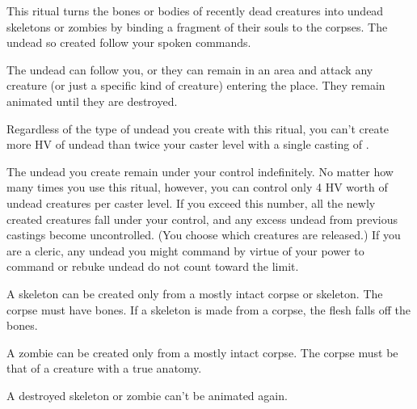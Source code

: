 \begin{spelleffect}
This ritual turns the bones or bodies of recently dead creatures into undead skeletons or zombies by binding a fragment of their souls to the corpses. The undead so created follow your spoken commands.
\par The undead can follow you, or they can remain in an area and attack any creature (or just a specific kind of creature) entering the place. They remain animated until they are destroyed.
\par Regardless of the type of undead you create with this ritual, you can't create more HV of undead than twice your caster level with a single casting of .
\par The undead you create remain under your control indefinitely. No matter how many times you use this ritual, however, you can control only 4 HV worth of undead creatures per caster level. If you exceed this number, all the newly created creatures fall under your control, and any excess undead from previous castings become uncontrolled. (You choose which creatures are released.) If you are a cleric, any undead you might command by virtue of your power to command or rebuke undead do not count toward the limit.
\par {} A skeleton can be created only from a mostly intact corpse or skeleton. The corpse must have bones. If a skeleton is made from a corpse, the flesh falls off the bones.
\par {} A zombie can be created only from a mostly intact corpse. The corpse must be that of a creature with a true anatomy.
\end{spelleffect}
\begin{spellnotes}
A destroyed skeleton or zombie can't be animated again.
\end{spellnotes}

